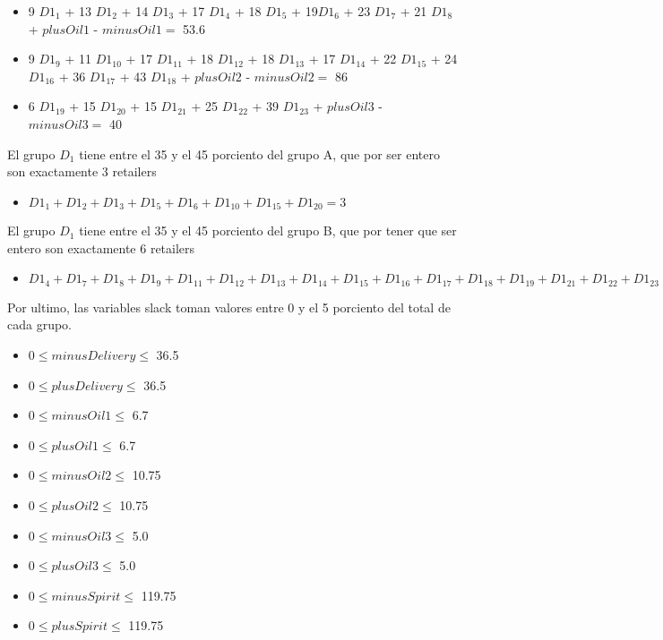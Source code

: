 \begin{itemize}
\item 9 ${D1}_1$ + 13 ${D1}_2$ + 14 ${D1}_3$ + 17 ${D1}_4$ + 18 ${D1}_5$ + 19${D1}_6$ + 23 ${D1}_7$ + 21 ${D1}_8$ + $plusOil1$ - $minusOil1 = $ 53.6
\item 9 ${D1}_9$ + 11 ${D1}_{10}$ + 17 ${D1}_{11}$ + 18 ${D1}_{12}$ + 18 ${D1}_{13}$ + 17 ${D1}_{14}$ + 22 ${D1}_{15}$ + 24 ${D1}_{16}$ + 36 ${D1}_{17}$ + 43 ${D1}_{18}$ + $plusOil2$ - $minusOil2 = $ 86
\item 6 ${D1}_{19}$ + 15 ${D1}_{20}$ + 15 ${D1}_{21}$ + 25 ${D1}_{22}$ + 39 ${D1}_{23}$ + $plusOil3$ - $minusOil3 = $ 40
\end{itemize}
El grupo $D_1$ tiene entre el 35 y el 45 porciento del grupo A, que por ser entero son exactamente 3 retailers \\
\begin{itemize}
\item ${D1}_1 + {D1}_2 + {D1}_3 + {D1}_5 + {D1}_6 + {D1}_{10} + {D1}_{15} + {D1}_{20} = 3$ \\
\end{itemize}

El grupo $D_1$ tiene entre el 35 y el 45 porciento del grupo B, que por tener que ser entero son exactamente 6 retailers \\

\begin{itemize}
\item ${D1}_4 + {D1}_7 + {D1}_8 + {D1}_9 + {D1}_{11} + {D1}_{12} + {D1}_{13} + {D1}_{14} + {D1}_{15} + {D1}_{16} + {D1}_{17} + {D1}_{18} + {D1}_{19} + {D1}_{21} + {D1}_{22} + {D1}_{23}   = 6$ \\
\end{itemize}

Por ultimo, las variables slack toman valores entre 0 y el 5 porciento del total de cada grupo.\\
\begin{itemize}
\item $0 \leq minusDelivery \leq$ 36.5
\item $0 \leq plusDelivery \leq$ 36.5
\item $0 \leq minusOil1 \leq$ 6.7
\item $0 \leq plusOil1 \leq$ 6.7
\item $0 \leq minusOil2 \leq$ 10.75
\item $0 \leq plusOil2 \leq$ 10.75
\item $0 \leq minusOil3 \leq$ 5.0
\item $0 \leq plusOil3 \leq$ 5.0
\item $0 \leq minusSpirit \leq$ 119.75
\item $0 \leq plusSpirit \leq$ 119.75
\end{itemize}

